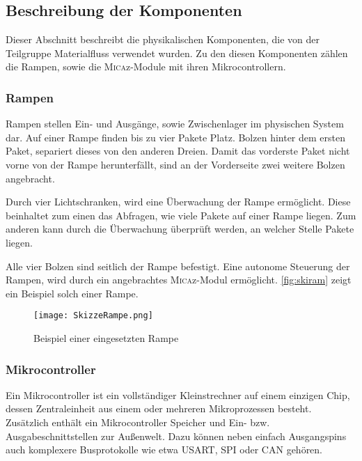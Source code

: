 \subsection{Beschreibung der Komponenten}
Dieser Abschnitt beschreibt die physikalischen Komponenten, die von der Teilgruppe Materialfluss verwendet wurden. Zu den diesen Komponenten zählen die Rampen, sowie die \textsc{Mica}z-Module mit ihren Mikrocontrollern. 
\subsubsection{Rampen}
Rampen stellen Ein- und Ausgänge, sowie Zwischenlager im physischen System dar. Auf einer Rampe finden bis zu vier Pakete Platz. Bolzen hinter dem ersten Paket, separiert dieses von den anderen Dreien. Damit das vorderste Paket nicht vorne von der Rampe herunterfällt, sind an der Vorderseite zwei weitere Bolzen angebracht. 

Durch vier Lichtschranken, wird eine Überwachung der Rampe ermöglicht. Diese beinhaltet zum einen das Abfragen, wie viele Pakete auf einer Rampe liegen. Zum anderen kann durch die Überwachung überprüft werden, an welcher Stelle Pakete liegen.

Alle vier Bolzen sind seitlich der Rampe befestigt. Eine autonome Steuerung der Rampen, wird durch ein angebrachtes \textsc{Mica}z-Modul ermöglicht.
\autoref{fig:skiram} zeigt ein Beispiel solch einer Rampe.

\begin{figure}[h!]
	\centering
		\texttt{[image: SkizzeRampe.png]}
	\caption{Beispiel einer eingesetzten Rampe}
	\label{fig:skiram}
\end{figure}

\subsubsection{Mikrocontroller}
Ein Mikrocontroller ist ein vollständiger Kleinstrechner auf einem einzigen Chip, dessen Zentraleinheit aus einem oder mehreren Mikroprozessen besteht. Zusätzlich enthält ein Mikrocontroller Speicher und Ein- bzw. Ausgabeschnittstellen zur Außenwelt. Dazu können neben einfach Ausgangspins auch komplexere Busprotokolle wie etwa USART, SPI oder CAN gehören.

